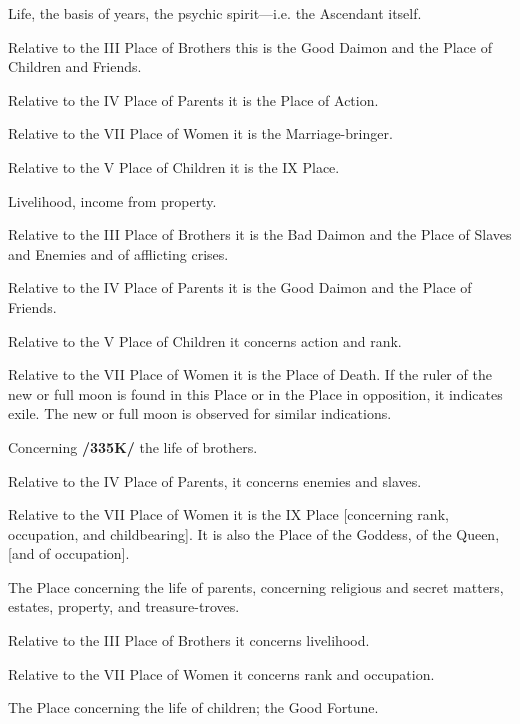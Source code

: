 \begin{description}[labelindent=0em , labelwidth=1em, labelsep=1em, leftmargin =!]
\item[I.] 
	Life, the basis of years, the psychic spirit—i.e. the Ascendant itself.
	
	Relative to the III Place of Brothers this is the Good Daimon and the Place of Children and Friends. 
	
	Relative to the IV Place of Parents it is the Place of Action. 
	
	Relative to the VII Place of Women it is the Marriage-bringer. 		
	
	Relative to the V Place of Children it is the IX Place.
	
\item[II.]
	 Livelihood, income from property. 
	 
	 Relative to the III Place of Brothers it is the Bad Daimon and the Place of Slaves and Enemies and of afflicting crises. 
	 
	 Relative to the IV Place of Parents it is the Good Daimon and the Place of Friends. 
	 
	 Relative to the V Place of Children it concerns action and rank. 
	 
	 Relative to the VII Place of Women it is the Place of Death. If the ruler of the new or full moon is found in this Place or in the Place in opposition, it indicates exile. The new or full moon is observed for similar indications.

\item[III.]
	Concerning \textbf{/335K/} the life of brothers. 
	
	Relative to the IV Place of Parents, it concerns enemies and slaves. 
	
	Relative to the VII Place of Women it is the IX Place [concerning rank, occupation, and childbearing]. It is also the Place of the Goddess, of the Queen, [and of occupation].

\item[IV.] 
	The Place concerning the life of parents, concerning religious and secret matters, estates, property, and treasure-troves. 
	
	Relative to the III Place of Brothers it concerns livelihood. 
	
	Relative to the VII Place of Women it concerns rank and occupation. 

\item[V.] 
	The Place concerning the life of children; the Good Fortune. 
	

\end{description}
